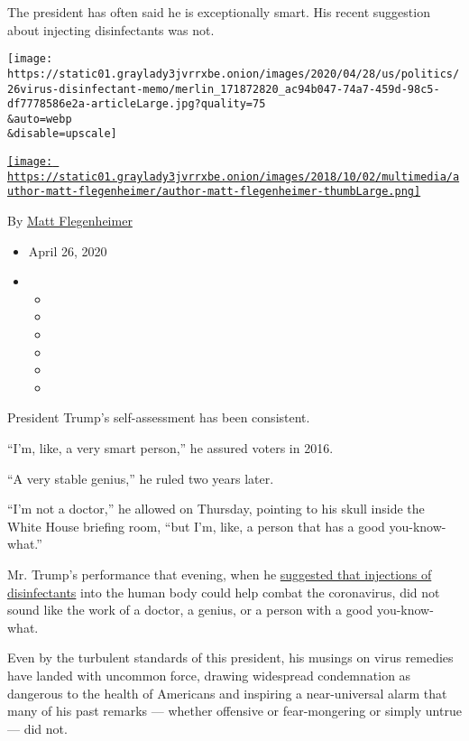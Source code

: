 The president has often said he is exceptionally smart. His recent
suggestion about injecting disinfectants was not.

\texttt{[image: https://static01.graylady3jvrrxbe.onion/images/2020/04/28/us/politics/26virus-disinfectant-memo/merlin\_171872820\_ac94b047-74a7-459d-98c5-df7778586e2a-articleLarge.jpg?quality=75\\\&auto=webp\\\&disable=upscale]}

\href{https://www.nytimes3xbfgragh.onion/by/matt-flegenheimer}{\texttt{[image: https://static01.graylady3jvrrxbe.onion/images/2018/10/02/multimedia/author-matt-flegenheimer/author-matt-flegenheimer-thumbLarge.png]}}

By \href{https://www.nytimes3xbfgragh.onion/by/matt-flegenheimer}{Matt
Flegenheimer}

\begin{itemize}
\item
  April 26, 2020
\item
  \begin{itemize}
  \item
  \item
  \item
  \item
  \item
  \item
  \end{itemize}
\end{itemize}

President Trump's self-assessment has been consistent.

``I'm, like, a very smart person,'' he assured voters in 2016.

``A very stable genius,'' he ruled two years later.

``I'm not a doctor,'' he allowed on Thursday, pointing to his skull
inside the White House briefing room, ``but I'm, like, a person that has
a good you-know-what.''

Mr. Trump's performance that evening, when he
\href{https://www.nytimes3xbfgragh.onion/2020/04/24/us/politics/trump-inject-disinfectant-bleach-coronavirus.html}{suggested
that injections of disinfectants} into the human body could help combat
the coronavirus, did not sound like the work of a doctor, a genius, or a
person with a good you-know-what.

Even by the turbulent standards of this president, his musings on virus
remedies have landed with uncommon force, drawing widespread
condemnation as dangerous to the health of Americans and inspiring a
near-universal alarm that many of his past remarks --- whether offensive
or fear-mongering or simply untrue --- did not.

